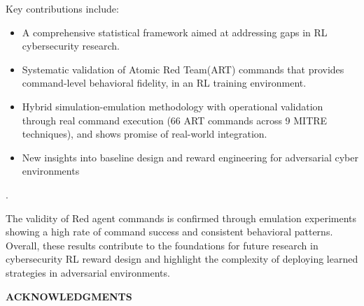 \documentclass[12pt,oneside]{article}
\begin{document}
Key contributions include: 
\begin{itemize}
    \item  A comprehensive statistical framework aimed at addressing gaps in RL cybersecurity research. 
    \item Systematic validation of Atomic Red Team(ART) commands that provides command-level behavioral fidelity, in an RL training environment.
    \item Hybrid simulation-emulation methodology with operational validation through real command execution (66 ART commands across 9 MITRE techniques), and shows promise of real-world integration.
    \item New insights into baseline design and reward engineering for adversarial cyber environments
\end{itemize}.

The validity of Red agent commands is confirmed through emulation experiments showing a high rate of command success and consistent behavioral patterns. Overall, these results contribute to the foundations for future research in cybersecurity RL reward design and highlight the complexity of deploying learned strategies in adversarial environments.

\clearpage
\begin{center}
\large\textbf{ACKNOWLEDGMENTS}
\end{center}
\end{document}
